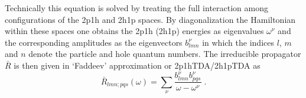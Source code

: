 Technically this equation is solved by treating the full interaction 
among configurations of the 2p1h and 2h1p spaces. By diagonalization the 
Hamiltonian within these spaces one obtains the 2p1h (2h1p) energies as
eigenvalues $\omega^\nu$ and the corresponding amplitudes as the eigenvectors
$b^\nu_{lmn}$ in which the indices $l$, $m$ and $n$ denote the particle and 
hole quantum numbers.
The irreducible propagator $\bar{R}$ is then given  in `Faddeev' 
approximation or 2p1hTDA/2h1pTDA as
%
	\begin{equation}
		\bar{R}_{lmn;pqs}(\omega)
	=
		\sum_\nu
		\frac{
			b^\nu_{lmn}
			b^\nu_{pqs}
		}{
		\omega - \omega^\nu
		}
	\label{eq:Risbb}
	\;.
	\end{equation}
%
